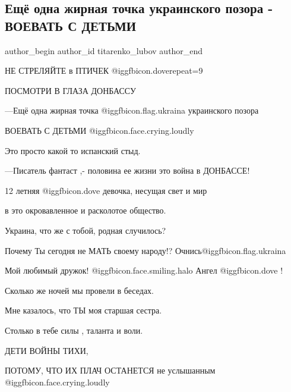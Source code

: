  
 
 
 
 
 
\subsection{Ещё одна жирная точка украинского позора - ВОЕВАТЬ С ДЕТЬМИ}
\label{sec:12_10_2021.fb.titarenko_lubov.1.pozor_savenkova_faina}
 
\ifcmt
 author_begin
   author_id titarenko_lubov
 author_end
\fi

НЕ СТРЕЛЯЙТЕ в ПТИЧЕК @igg{fbicon.dove}{repeat=9}

ПОСМОТРИ В ГЛАЗА ДОНБАССУ

—Ещё одна жирная точка  @igg{fbicon.flag.ukraina} украинского позора 

ВОЕВАТЬ С ДЕТЬМИ @igg{fbicon.face.crying.loudly} 

Это просто какой то испанский стыд.

 —Писатель фантаст ,- половина ее жизни это война в ДОНБАССЕ!

12 летняя  @igg{fbicon.dove}  девочка, несущая свет и мир 

в это окровавленное и расколотое общество.

 Украина, что же с тобой, родная случилось?

Почему Ты сегодня не МАТЬ своему народу!?  Очнись@igg{fbicon.flag.ukraina}

Мой любимый дружок!  @igg{fbicon.face.smiling.halo}  Ангел  @igg{fbicon.dove} !  

Сколько же ночей мы провели в беседах.  

Мне казалось, что ТЫ  моя старшая сестра.  

Столько в тебе силы , таланта и воли.

ДЕТИ ВОЙНЫ ТИХИ, 

ПОТОМУ, ЧТО ИХ ПЛАЧ ОСТАНЕТСЯ не услышанным @igg{fbicon.face.crying.loudly} 

